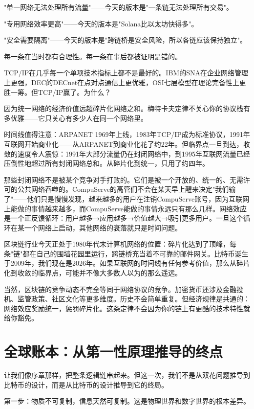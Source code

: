 \documentclass[a4paper,12pt,openany]{ctexbook}
\begin{document}
"单一网络无法处理所有流量"——今天的版本是"一条链无法处理所有交易"。

"专用网络效率更高"——今天的版本是"Solana比以太坊快得多"。

"安全需要隔离"——今天的版本是"跨链桥是安全风险，所以各链应该保持独立"。

每一条在当时都有合理性。每一条在事后都被证明是错的。

TCP/IP在几乎每一个单项技术指标上都不是最好的。IBM的SNA在企业网络管理上更强，DEC的DECnet在点对点通信上更优雅，OSI七层模型在理论完备性上更胜一筹。但TCP/IP赢了。为什么？

因为统一网络的经济价值远超碎片化网络之和。梅特卡夫定律不关心你的协议栈有多优雅——它只关心有多少人在同一个网络里。

时间线值得注意：ARPANET 1969年上线，1983年TCP/IP成为标准协议，1991年互联网开始商业化——从ARPANET到商业化花了约22年。但临界点一旦到达，收敛的速度令人震惊：1991年大部分流量仍在封闭网络中，到1995年互联网流量已经压倒性地超过所有封闭网络总和。从碎片化到统一，只用了约四年。

那些封闭网络不是被某个竞争对手打败的。它们是被一个开放的、统一的、无需许可的公共网络吞噬的。CompuServe的高管们不会在某天早上醒来决定"我们输了"——他们只是慢慢发现，越来越多的用户在注销CompuServe账号，因为互联网上能做的事情越来越多，而CompuServe能做的事情永远只有那么几样。网络效应是一个正反馈循环：用户越多→应用越多→价值越大→吸引更多用户。一旦这个循环在某一个网络上启动，其他网络的衰落就只是时间问题。

区块链行业今天正处于1980年代末计算机网络的位置：碎片化达到了顶峰，每条"链"都在自己的围墙花园里运行，跨链桥充当着不可靠的邮件网关。比特币诞生于2009年，我们现在是2026年。如果互联网的时间线有任何参考价值，那么从碎片化到收敛的临界点，可能并不像大多数人以为的那么遥远。

当然，区块链的竞争动态不完全等同于网络协议的竞争。加密货币还涉及金融投机、监管政策、社区文化等更多维度。历史不会简单重复。但经济规律是共通的：网络效应奖励统一，惩罚碎片化。这条定律不会因为你的链上有更酷的技术特性就给你豁免。


\section*{全球账本：从第一性原理推导的终点}


让我们像序章那样，把整条逻辑链串起来。但这一次，我们不是从双花问题推导到比特币的设计，而是从比特币的设计推导到它的终局。

第一步：物质不可复制，信息天然可复制。这是物理世界和数字世界的根本差异。
\end{document}
